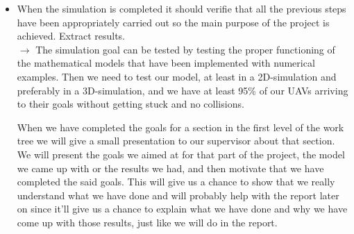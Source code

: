 \documentclass{article}
\begin{document}
\begin{itemize}
		\item When the simulation is completed it should verifie that all the previous steps have been appropriately carried out so the main purpose of the project is achieved. Extract results. \\
		$\rightarrow$ The simulation goal can be tested by testing the proper functioning of the mathematical models that have been implemented with numerical examples. Then we need to test our model, at least in a 2D-simulation and preferably in a 3D-simulation, and we have at least 95\% of our UAVs arriving to their goals without getting stuck and no collisions. %

		\vspace{2em}
		 When we have completed the goals for a section in the first level of the work tree we will give a small presentation to our supervisor about that section. We will present the goals we aimed at for that part of the project, the model we came up with or the results we had, and then motivate that we have completed the said goals. This will give us a chance to show that we really understand what we have done and will probably help with the report later on since it'll give us a chance to explain what we have done and why we have come up with those results, just like we will do in the report.  
	\end{itemize}
	\bigskip
\end{document}
